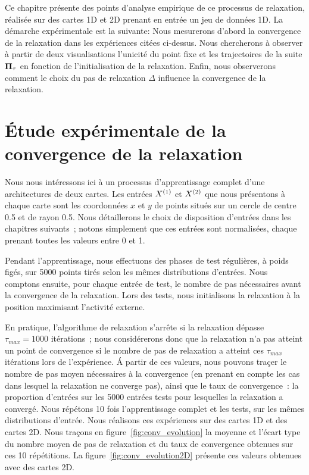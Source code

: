 \documentclass[../main]{subfiles}
\begin{document}
Ce chapitre présente des points d'analyse empirique de ce processus de relaxation, réalisée sur des cartes 1D et 2D prenant en entrée un jeu de données 1D.
La démarche expérimentale est la suivante:
Nous mesurerons d'abord la convergence de la relaxation dans les expériences citées ci-dessus.
Nous chercherons à observer à partir de deux visualisations l'unicité du point fixe et les trajectoires de la suite $\mathbf{\Pi}_\tau$ en fonction de l'initialisation de la relaxation.
Enfin, nous observerons comment le choix du pas de relaxation $\Delta$ influence la convergence de la relaxation.

\section{\'Etude expérimentale de la convergence de la relaxation}

Nous nous intéressons ici  à un processus d'apprentissage complet d'une architectures de deux cartes. Les entrées $X^{({1})}$ et $X^{({2})}$ que nous présentons à chaque carte sont les coordonnées $x$ et $y$ de points situés sur un cercle de centre 0.5 et de rayon 0.5. 
Nous détaillerons le choix de disposition d'entrées dans les chapitres suivants~; notons simplement que ces entrées sont normalisées, chaque prenant toutes les valeurs entre 0 et 1. 

Pendant l'apprentissage, nous effectuons des phases de test régulières, à poids figés, sur 5000 points tirés selon les mêmes distributions d'entrées. 
Nous comptons ensuite, pour chaque entrée de test, le nombre de pas nécessaires avant la convergence de la relaxation. Lors des tests, nous initialisons la relaxation à la position maximisant l'activité externe.

En pratique, l'algorithme de relaxation s'arrête si la relaxation dépasse $\tau_{max}= 1000$ itérations~; nous considérerons donc que la relaxation n'a pas atteint un point de convergence si le nombre de pas de relaxation a atteint ces $\tau_{max}$ itérations lors de l'expérience. 
\'A partir de ces valeurs, nous pouvons traçer le nombre de pas moyen nécessaires à la convergence (en prenant en compte les cas dans lesquel la relaxation ne converge pas), ainsi que le taux de convergence~: la proportion d'entrées sur les 5000 entrées tests pour lesquelles la relaxation a convergé.
Nous répétons 10 fois l'apprentissage complet et les tests, sur les mêmes distributions d'entrée.
Nous réalisons ces expériences sur des cartes 1D et des cartes 2D.
Nous traçons en figure~\ref{fig:conv_evolution} la moyenne et l'écart type du nombre moyen de pas de relaxation et du taux de convergence obtenues sur ces 10 répétitions. La figure~\ref{fig:conv_evolution2D} présente ces valeurs obtenues avec des cartes 2D.
\end{document}
